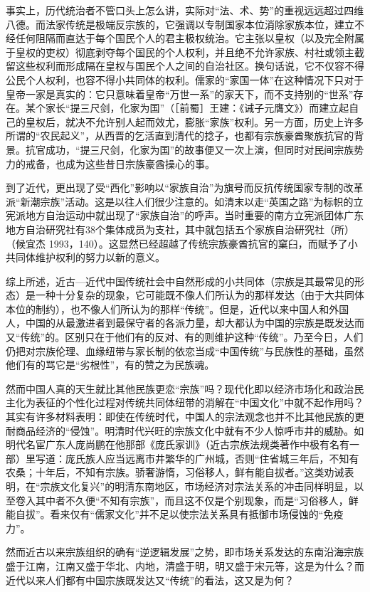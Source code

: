 \documentclass[a4paper,12pt,punct=kaiming,fontset=none]{ctexart}
\begin{document}
事实上，历代统治者不管口头上怎么讲，实际对“法、术、势”的重视远远超过四维八德。而法家传统是极端反宗族的，它强调以专制国家本位消除家族本位，建立不经任何阻隔而直达于每个国民个人的君主极权统治。它主张以皇权（以及完全附属于皇权的吏权）彻底剥夺每个国民的个人权利，并且绝不允许家族、村社或领主截留这些权利而形成隔在皇权与国民个人之间的自治社区。换句话说，它不仅容不得公民个人权利，也容不得小共同体的权利。儒家的“家国一体”在这种情况下只对于皇帝一家是真实的：它只意味着皇帝“万世一系”的家天下，而不支持别的“世系”存在。某个家长“提三尺剑，化家为国”（［前蜀］王建：《诫子元膺文》）而建立起自己的皇权后，就决不允许别人起而效尤，膨胀“家族”权利。另一方面，历史上许多所谓的“农民起义”，从西晋的乞活直到清代的捻子，也都有宗族豪酋聚族抗官的背景。抗官成功，“提三尺剑，化家为国”的故事便又一次上演，但同时对民间宗族势力的戒备，也成为这些昔日宗族豪酋操心的事。

到了近代，更出现了受“西化”影响以“家族自治”为旗号而反抗传统国家专制的改革派“新潮宗族”活动。这是以往人们很少注意的。如清末以走“英国之路”为标帜的立宪派地方自治运动中就出现了“家族自治”的呼声。当时重要的南方立宪派团体广东地方自治研究社有38个集体成员为支社，其中就包括五个家族自治研究社（所）（候宜杰 1993，140）。这显然已经超越了传统宗族豪酋抗官的窠臼，而赋予了小共同体维护权利的努力以新的意义。

综上所述，近古—近代中国传统社会中自然形成的小共同体（宗族是其最常见的形态）是一种十分复杂的现象，它可能既不像人们所认为的那样发达（由于大共同体本位的制约），也不像人们所认为的那样“传统”。但是，近代以来中国人和外国人，中国的从最激进者到最保守者的各派力量，却大都认为中国的宗族是既发达而又“传统”的。区别只在于他们有的反对、有的则维护这种“传统”。乃至今日，人们仍把对宗族伦理、血缘纽带与家长制的依恋当成“中国传统”与民族性的基础，虽然他们有的骂它是“劣根性”，有的赞之为民族魂。

然而中国人真的天生就比其他民族更恋“宗族”吗？现代化即以经济市场化和政治民主化为表征的个性化过程对传统共同体纽带的消解在“中国文化”中就不起作用吗？其实有许多材料表明：即使在传统时代，中国人的宗法观念也并不比其他民族的更耐商品经济的“侵蚀”。明清时代兴旺的宗族文化中就有不少人惊呼市井的威胁。如明代名宦广东人庞尚鹏在他那部《庞氏家训》（近古宗族法规类著作中极有名有一部）里写道：庞氏族人应当远离市井繁华的广州城，否则“住省城三年后，不知有农桑；十年后，不知有宗族。骄奢游惰，习俗移人，鲜有能自拔者。”这类劝诫表明，在“宗族文化复兴”的明清东南地区，市场经济对宗法关系的冲击同样明显，以至卷入其中者不久便“不知有宗族”，而且这不仅是个别现象，而是“习俗移人，鲜能自拔”。看来仅有“儒家文化”并不足以使宗法关系具有抵御市场侵蚀的“免疫力”。

然而近古以来宗族组织的确有“逆逻辑发展”之势，即市场关系发达的东南沿海宗族盛于江南，江南又盛于华北、内地，清盛于明，明又盛于宋元等，这是为什么？而近代以来人们都有中国宗族既发达又“传统”的看法，这又是为何？
\end{document}
